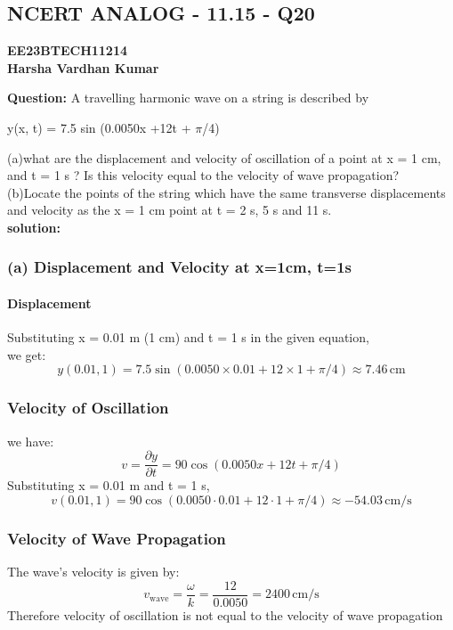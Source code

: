\documentclass{article}
\begin{document}
\begin{center}
  \section*{\textbf{ NCERT ANALOG - 11.15 - Q20}}
\end{center}
\begin{flushright}
\textbf{EE23BTECH11214}\\
\textbf{Harsha Vardhan Kumar}
\end{flushright}
\noindent\textbf{Question:}
A travelling harmonic wave on a string is described by
\begin{center}
    y(x, t) = 7.5 sin (0.0050x +12t +  $\pi$/4)
\end{center} 
(a)what are the displacement and velocity of oscillation of a point at
x = 1 cm, and t = 1 s ? Is this velocity equal to the velocity of wave propagation?
\\(b)Locate the points of the string which have the same transverse displacements
and velocity as the x = 1 cm point at t = 2 s, 5 s and 11 s.
\\\noindent\textbf{solution:}
\subsubsection*{(a) Displacement and Velocity at x=1cm, t=1s}
\paragraph*{Displacement}
Substituting x = 0.01 m (1 cm) and t = 1 s in the given equation,\\we get:
\begin{equation}
y(0.01, 1) = 7.5 \sin (0.0050 \times 0.01 + 12 \times 1 + \pi/4) \approx 7.46\,\text{cm}
\end{equation}
\subsubsection*{Velocity of Oscillation}
we have:
\begin{equation}
v = \frac{\partial y}{\partial t} = 90 \cos (0.0050x + 12t + \pi/4)
\end{equation}
Substituting x = 0.01 m and t = 1 s,
\begin{equation}
v(0.01, 1) = 90 \cos (0.0050 \cdot 0.01 + 12 \cdot 1 + \pi/4) \approx -54.03\,\text{cm/s}
\end{equation}
\subsubsection*{Velocity of Wave Propagation}
The wave's velocity is given by:
\begin{equation}
v_\text{wave} = \frac{\omega}{k} = \frac{12}{0.0050} = 2400\,\text{cm/s}
\end{equation}
Therefore velocity of oscillation is not equal to the velocity of wave propagation
\end{document}
